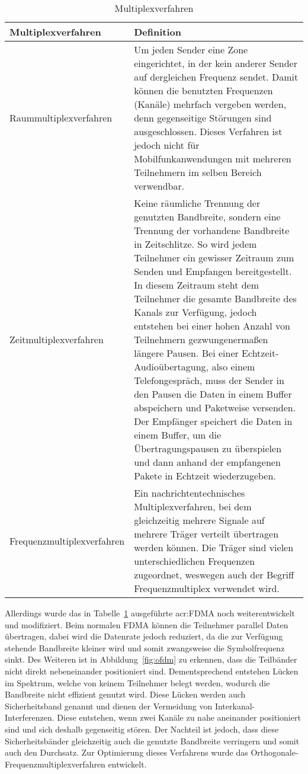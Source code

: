 \begin{table}[htb]
	\begin{center}
		\begin{tabular}{p{}  p{}}
			\toprule
			\textbf{Multiplexverfahren} &  \textbf{Definition} \\ 
			\midrule
			Raummultiplexverfahren	& Um jeden Sender eine Zone eingerichtet, in der kein anderer Sender auf dergleichen Frequenz sendet. Damit können die benutzten Frequenzen (Kanäle) mehrfach vergeben werden, denn gegenseitige Störungen sind ausgeschlossen. Dieses Verfahren ist jedoch nicht für Mobilfunkanwendungen mit mehreren Teilnehmern im selben Bereich verwendbar.\\
			\midrule
			Zeitmultiplexverfahren	& Keine räumliche Trennung der genutzten Bandbreite, sondern  eine Trennung der vorhandene Bandbreite in Zeitschlitze. So wird jedem Teilnehmer ein gewisser Zeitraum zum Senden und Empfangen bereitgestellt. In diesem Zeitraum steht dem Teilnehmer die gesamte Bandbreite  des Kanals zur Verfügung, jedoch entstehen bei einer hohen Anzahl von Teilnehmern gezwungenermaßen längere Pausen. Bei einer Echtzeit-Audioübertagung, also einem Telefongespräch, muss der Sender in den Pausen die Daten in einem Buffer abspeichern und Paketweise versenden. Der Empfänger speichert die Daten in einem Buffer, um die Übertragungspausen zu überspielen und dann anhand der empfangenen Pakete in Echtzeit wiederzugeben.\\
			\midrule
			Frequenzmultiplexverfahren	& Ein nachrichtentechnisches Multiplexverfahren, bei dem gleichzeitig mehrere Signale auf mehrere Träger verteilt übertragen werden können. Die Träger sind vielen unterschiedlichen Frequenzen zugeordnet, weswegen auch der Begriff Frequenzmultiplex verwendet wird.\\	
			\bottomrule
\end{tabular}
\caption{Multiplexverfahren}
\label{tab:multiplex}
\end{center}
\end{table}

Allerdings wurde das in Tabelle~\ref{tab:multiplex} ausgeführte \gls{acr:FDMA} noch weiterentwickelt und modifiziert. Beim normalen FDMA können die Teilnehmer parallel Daten übertragen, dabei wird die Datenrate jedoch reduziert, da die zur Verfügung stehende Bandbreite kleiner wird und somit zwangsweise die Symbolfrequenz sinkt. Des Weiteren ist in Abbildung~\ref{fig:ofdm} zu erkennen, dass die Teilbänder nicht direkt nebeneinander positioniert sind. Dementsprechend entstehen Lücken im Spektrum, welche von keinem Teilnehmer belegt werden, wodurch die Bandbreite nicht effizient genutzt wird. Diese Lücken werden auch Sicherheitsband genannt und dienen der Vermeidung von Interkanal-Interferenzen. Diese entstehen, wenn zwei Kanäle zu nahe aneinander positioniert sind und sich deshalb gegenseitig stören. Der Nachteil ist jedoch, dass diese Sicherheitsbänder gleichzeitig auch die genutzte Bandbreite verringern und somit auch den Durchsatz. Zur Optimierung dieses Verfahrens wurde das Orthogonale-Frequenzmultiplexverfahren entwickelt.

